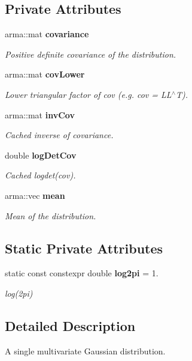 \subsection*{Private Attributes}
\begin{DoxyCompactItemize}
\item 
arma\+::mat {\bf covariance}
\begin{DoxyCompactList}\small\item\em Positive definite covariance of the distribution. \end{DoxyCompactList}\item 
arma\+::mat {\bf cov\+Lower}
\begin{DoxyCompactList}\small\item\em Lower triangular factor of cov (e.\+g. cov = L\+L$^\wedge$T). \end{DoxyCompactList}\item 
arma\+::mat {\bf inv\+Cov}
\begin{DoxyCompactList}\small\item\em Cached inverse of covariance. \end{DoxyCompactList}\item 
double {\bf log\+Det\+Cov}
\begin{DoxyCompactList}\small\item\em Cached logdet(cov). \end{DoxyCompactList}\item 
arma\+::vec {\bf mean}
\begin{DoxyCompactList}\small\item\em Mean of the distribution. \end{DoxyCompactList}\end{DoxyCompactItemize}
\subsection*{Static Private Attributes}
\begin{DoxyCompactItemize}
\item 
static const constexpr double {\bf log2pi} = 1.
\begin{DoxyCompactList}\small\item\em log(2pi) \end{DoxyCompactList}\end{DoxyCompactItemize}


\subsection{Detailed Description}
A single multivariate Gaussian distribution. 

